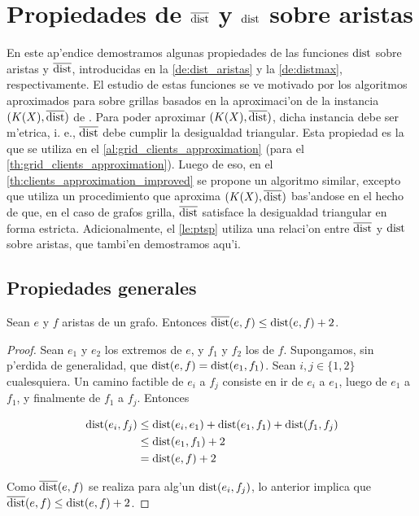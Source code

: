 \chapter{Propiedades de $\overline{\textnormal{dist}}$ y $\textnormal{dist}$ sobre aristas}

\label{ch:dist_distmax}

En este ap'endice demostramos algunas propiedades de las funciones $\textnormal{dist}$ sobre aristas y $\overline{\textnormal{dist}}$, introducidas en la \autoref{de:dist_aristas} y la \autoref{de:distmax}, respectivamente. El estudio de estas funciones se ve motivado por los algoritmos aproximados para  sobre grillas basados en la aproximaci'on de la instancia $(K(X), \overline{\textnormal{dist}})$ de . Para poder aproximar $(K(X), \overline{\textnormal{dist}})$, dicha instancia debe ser m'etrica, i. e., $\overline{\textnormal{dist}}$ debe cumplir la desigualdad triangular. Esta propiedad es la que se utiliza en el \autoref{al:grid_clients_approximation} (para el \autoref{th:grid_clients_approximation}). Luego de eso, en el \autoref{th:clients_approximation_improved} se propone un algoritmo similar, excepto que utiliza un procedimiento que aproxima $(K(X), \overline{\textnormal{dist}})$  bas'andose en el hecho de que, en el caso de grafos grilla, $\overline{\textnormal{dist}}$ satisface la desigualdad triangular en forma estricta. Adicionalmente, el \autoref{le:ptsp} utiliza una relaci'on entre $\overline{\textnormal{dist}}$ y $\textnormal{dist}$ sobre aristas, que tambi'en demostramos aqu'i.

\section{Propiedades generales}

\begin{lemma}
\label{le:distmax_leq_dist_plus_2}
Sean $e$ y $f$ aristas de un grafo. Entonces $\overline{\textnormal{dist}}(e, f) \leq \textnormal{dist}(e, f) + 2$.

\begin{proof}
Sean $e_1$ y $e_2$ los extremos de $e$, y $f_1$ y $f_2$ los de $f$. Supongamos, sin p'erdida de generalidad, que $\textnormal{dist}(e, f) = \textnormal{dist}(e_1, f_1)$. Sean $i, j \in \{1, 2\}$ cualesquiera. Un camino factible de $e_i$ a $f_j$ consiste en ir de $e_i$ a $e_1$, luego de $e_1$ a $f_1$, y finalmente de $f_1$ a $f_j$. Entonces

\begin{align*}
\textnormal{dist}(e_i, f_j) &\leq \textnormal{dist}(e_i, e_1) + \textnormal{dist}(e_1, f_1) + \textnormal{dist}(f_1, f_j)\\
&\leq \textnormal{dist}(e_1, f_1) + 2\\
&= \textnormal{dist}(e, f) + 2
\end{align*}

Como $\overline{\textnormal{dist}}(e, f)$ se realiza para alg'un $\textnormal{dist}(e_i, f_j)$, lo anterior implica que $\overline{\textnormal{dist}}(e, f) \leq \textnormal{dist}(e, f) + 2$.
\end{proof}
\end{lemma}

